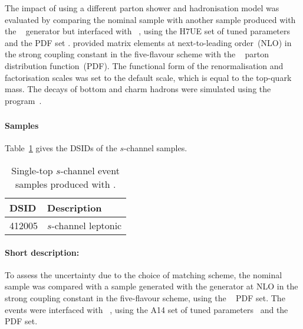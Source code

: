 The impact of using a different parton shower and hadronisation model was evaluated by comparing the nominal sample
with another sample produced with the \POWHEGBOX[v2]~\cite{Alioli:2009je,Nason:2004rx,Frixione:2007vw,Alioli:2010xd}
generator but interfaced with \HERWIG[7.04]~\cite{Bahr:2008pv,Bellm:2015jjp}, using the H7UE set of
tuned parameters~\cite{Bellm:2015jjp} and the \MMHT[lo] PDF set \cite{Harland-Lang:2014zoa}.
\POWHEGBOX provided matrix elements at next-to-leading order~(NLO) in the strong coupling constant \alphas
in the five-flavour scheme with the \NNPDF[3.0nlo]~\cite{Ball:2014uwa} parton distribution function~(PDF).
The functional form of the renormalisation and factorisation scales was set to the default scale, which is equal to the top-quark mass.
The decays of bottom and charm hadrons were simulated using the \EVTGEN[1.6.0] program~\cite{Lange:2001uf}.


\subsubsection[MadGraph5\_aMC@NLO+Pythia8]{\MGNLOPY[8]}
\label{subsubsec:schan_aMCP8}

\paragraph{Samples}

Table~\ref{tab:schan_aMCP8} gives the DSIDs of the $s$-channel \MGNLOPY[8] samples.

\begin{table}[htbp]
  \caption{Single-top $s$-channel event samples produced with \MGNLOPY[8].}%
  \label{tab:schan_aMCP8}
  \centering
  \begin{tabular}{l l}
    \toprule
    DSID & Description \\
    \midrule
    412005 & $s$-channel leptonic \\
    \bottomrule
  \end{tabular}
\end{table}

\paragraph{Short description:}

To assess the uncertainty due to the choice of matching scheme, the nominal sample was compared with a sample generated
with the \MGNLO[2.6.2] generator at NLO in the strong coupling constant \alphas in the five-flavour scheme, 
using the \NNPDF[3.0nlo]~\cite{Ball:2014uwa} PDF set.
The events were interfaced with \PYTHIA[8.230]~\cite{Sjostrand:2014zea}, using the A14 set of tuned parameters~\cite{ATL-PHYS-PUB-2014-021} 
and the \NNPDF[2.3lo] PDF set.


